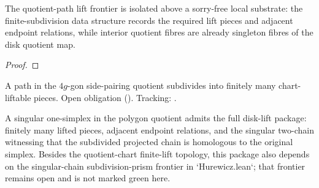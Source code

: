 \begin{lemma}
\label{lem:polygon4g-quotient-local-lift-substrate}
The quotient-path lift frontier is isolated above a sorry-free local
substrate: the finite-subdivision data structure records the required lift
pieces and adjacent endpoint relations, while interior quotient fibres are
already singleton fibres of the disk quotient map.
\leanok
\end{lemma}
\begin{proof}\leanok\end{proof}

\begin{lemma}
\label{lem:polygon4g-quotient-path-finite-lift-subdivision}
A path in the \(4g\)-gon side-pairing quotient subdivides into finitely many
chart-liftable pieces. Open obligation ().
Tracking: .
\end{lemma}

\begin{lemma}
\label{lem:polygon4g-singular-simplex-subdivision-lifts-to-disk}
A singular one-simplex in the polygon quotient admits the full disk-lift
package: finitely many lifted pieces, adjacent endpoint relations, and the
singular two-chain witnessing that the subdivided projected chain is homologous
to the original simplex. Besides the quotient-chart finite-lift topology, this
package also depends on the singular-chain subdivision-prism frontier in
`Hurewicz.lean`; that frontier remains open and is not marked green here.
\end{lemma}

